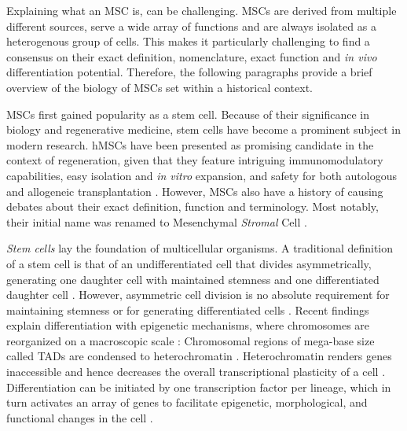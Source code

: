 Explaining what an \ac{MSC} is, can be challenging. MSCs
are derived from multiple different sources, serve a wide array of functions and
are always isolated as a heterogenous group of cells. This makes it particularly
challenging to find a consensus on their exact definition, nomenclature, exact
function and \textit{in vivo} differentiation potential. Therefore, the
following paragraphs provide a brief overview of the biology of MSCs set within
a historical context.


\acp{MSC} first gained popularity as a stem cell. Because of their significance
in biology and regenerative medicine, stem cells have become a prominent subject
in modern research. \acp{hMSC} have been presented as promising candidate in the
context of regeneration, given that they feature intriguing immunomodulatory
capabilities, easy isolation and \textit{in vitro} expansion, and safety for
both autologous and allogeneic transplantation
\cite{ullahHumanMesenchymalStem2015}. However, \acp{MSC} also have a history of
causing debates about their exact definition, function and terminology. Most
notably, their initial name  was renamed
to Mesenchymal \textit{Stromal} Cell \cite{robeyMesenchymalStemCells2017}.


\emph{Stem cells} lay the foundation of multicellular organisms. A traditional
definition of a stem cell is that of an undifferentiated cell that divides
asymmetrically, generating one daughter cell with maintained stemness and one
differentiated daughter cell \cite{cooperCellProliferationDevelopment2000,
    shenghuiMechanismsStemCell2009}. However, asymmetric cell division is no
absolute requirement for maintaining stemness or for generating differentiated cells
\cite{morrisonStemCellsNiches2008, yamashitaPolarityStemCell2010,
    shahriyariSymmetricVsAsymmetric2013, nakamuraAsymmetricitySisterCells2018}.
Recent findings explain differentiation with epigenetic mechanisms, where
chromosomes are reorganized on a macroscopic scale
\cite{dixonChromatinArchitectureReorganization2015}: Chromosomal regions of
mega-base size called \acp{TAD}  are condensed to heterochromatin
\cite{ciabrelliChromatinDrivenBehaviorTopologically2015}. Heterochromatin
renders genes inaccessible and hence decreases the overall transcriptional
plasticity of a cell \cite{stanchevaRevisitingHeterochromatinEmbryonic2011,
    xieEpigenomicAnalysisMultilineage2013, chenSpatialGenomeReorganization2019}.
Differentiation can be initiated by one transcription factor per lineage, which
in turn activates an array of genes to facilitate epigenetic, morphological, and
functional changes in the cell \cite{almalkiKeyTranscriptionFactors2016,
    walewskaMesenchymalStemCells2023}.

